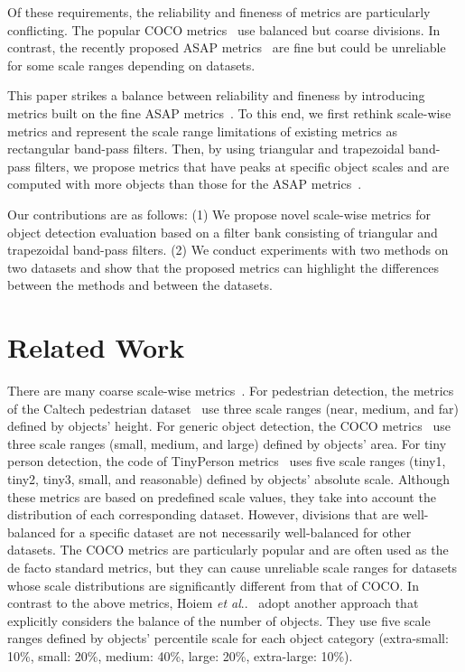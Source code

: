 \documentclass{mva_style}
\makeatletter
\DeclareRobustCommand\onedot{\futurelet\@let@token\@onedot}
\def\@onedot{\ifx\@let@token.\else.\null\fi\xspace}
\def\etal{\emph{et al}\onedot}
\makeatother
\begin{document}
Of these requirements, the reliability and fineness of metrics are particularly conflicting.
The popular COCO metrics~\cite{COCO_ECCV2014, cocoapi} use balanced but coarse divisions.
In contrast, the recently proposed ASAP metrics~\cite{USB_Shinya_BMVC2022} are fine but could be unreliable for some scale ranges depending on datasets.

This paper strikes a balance between reliability and fineness by introducing metrics built on the fine ASAP metrics~\cite{USB_Shinya_BMVC2022}.
To this end, we first rethink scale-wise metrics and represent the scale range limitations of existing metrics as rectangular band-pass filters.
Then, by using triangular and trapezoidal band-pass filters, we propose metrics that have peaks at specific object scales
and are computed with more objects than those for the ASAP metrics~\cite{USB_Shinya_BMVC2022}.


Our contributions are as follows:
(1) We propose novel scale-wise metrics for object detection evaluation based on a filter bank consisting of triangular and trapezoidal band-pass filters.
(2) We conduct experiments with two methods on two datasets and show that the proposed metrics can highlight the differences between the methods and between the datasets.



\section{Related Work}
\label{sec:related_work}


There are many coarse scale-wise metrics~\cite{DiagDet_ECCV2012, Caltech_PAMI2012, COCO_ECCV2014, TinyPerson_WACV2020, TIDE_ECCV2020, REVISE_ECCV2020}.
For pedestrian detection, the metrics of the Caltech pedestrian dataset~\cite{Caltech_PAMI2012} use three scale ranges (near, medium, and far) defined by objects' height.
For generic object detection, the COCO metrics~\cite{COCO_ECCV2014, cocoapi} use three scale ranges (small, medium, and large) defined by objects' area.
For tiny person detection, the code of TinyPerson metrics~\cite{TinyPerson_WACV2020} uses five scale ranges (tiny1, tiny2, tiny3, small, and reasonable) defined by objects' absolute scale.
Although these metrics are based on predefined scale values, they take into account the distribution of each corresponding dataset.
However, divisions that are well-balanced for a specific dataset are not necessarily well-balanced for other datasets.
The COCO metrics are particularly popular and are often used as the de facto standard metrics, but they can cause unreliable scale ranges for datasets whose scale distributions are significantly different from that of COCO.
In contrast to the above metrics, Hoiem \etal~\cite{DiagDet_ECCV2012} adopt another approach that explicitly considers the balance of the number of objects.
They use five scale ranges defined by objects' percentile scale for each object category (extra-small: 10\%, small: 20\%, medium: 40\%, large: 20\%, extra-large: 10\%).
\end{document}
